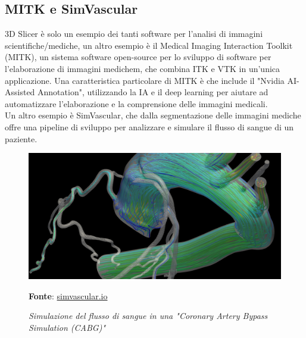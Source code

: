 \subsection{MITK e SimVascular}
3D Slicer è solo un esempio dei tanti software per l'analisi di immagini scientifiche/mediche, un altro esempio è il Medical Imaging Interaction Toolkit (MITK), un sistema software open-source per lo sviluppo di software per l'elaborazione di immagini medichem, che combina ITK e VTK in un'unica applicazione. Una caratteristica particolare di MITK è che include il "Nvidia AI-Assisted Annotation", utilizzando la IA e il deep learning per aiutare ad automatizzare l'elaborazione e la comprensione delle immagini medicali.
\\
Un altro esempio è SimVascular, che dalla segmentazione delle immagini mediche offre una pipeline di sviluppo per analizzare e simulare il flusso di sangue di un paziente.
\begin{figure}[h]
    \centering
    \includegraphics[scale=0.15]{immagini/volumerendering/simvascular.png}
    \caption{\textit{Simulazione del flusso di sangue in una "Coronary Artery Bypass Simulation (CABG)"}}
    \textbf{Fonte}: \href{http://simvascular.github.io/}{simvascular.io}
    \label{fig: SimVascular}
\end{figure}


